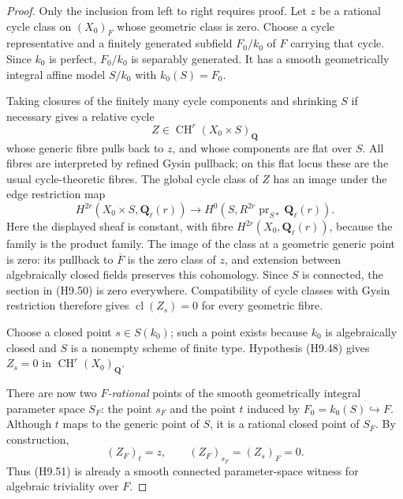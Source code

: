 \documentclass[11pt,a4paper]{article}
\begin{document}
\begin{proof}
Only the inclusion from left to right requires proof. Let $z$ be a
rational cycle class on $(X_0)_F$ whose geometric class is zero.
Choose a cycle representative and a finitely generated subfield
$F_0/k_0$ of $F$ carrying that cycle. Since $k_0$ is perfect,
$F_0/k_0$ is separably generated. It has a smooth geometrically
integral affine model $S/k_0$ with $k_0(S)=F_0$.

Taking closures of the finitely many cycle components and shrinking
$S$ if necessary gives a relative cycle
\[
 Z\in\operatorname{CH}^r(X_0\times S)_{\mathbf Q}
\]
whose generic fibre pulls back to $z$, and whose components are flat
over $S$. All fibres are interpreted by refined Gysin pullback; on
this flat locus these are the usual cycle-theoretic fibres. The
global cycle class of $Z$ has an image under the edge restriction map
\[
 H^{2r}(X_0\times S,\mathbf Q_\ell(r))
  \longrightarrow
 H^0\!\left(S,R^{2r}\operatorname{pr}_{S*}\mathbf Q_\ell(r)\right).
                                                               \tag{H9.50}
\]
Here the displayed sheaf is constant, with fibre
$H^{2r}(X_0,\mathbf Q_\ell(r))$, because the family is the product
family. The image of the class at a geometric generic point is zero:
its pullback to $\overline F$ is the zero class of $z$, and extension
between algebraically closed fields preserves this cohomology.
Since $S$ is connected, the section in (H9.50) is zero everywhere.
Compatibility of cycle classes with Gysin restriction therefore
gives $\operatorname{cl}(Z_s)=0$ for every geometric fibre.

Choose a closed point $s\in S(k_0)$; such a point exists because
$k_0$ is algebraically closed and $S$ is a nonempty scheme of finite
type. Hypothesis (H9.48) gives $Z_s=0$ in
$\operatorname{CH}^r(X_0)_{\mathbf Q}$.

There are now two \emph{$F$-rational} points of the smooth
geometrically integral parameter space $S_F$: the point $s_F$ and
the point $t$ induced by $F_0=k_0(S)\hookrightarrow F$. Although
$t$ maps to the generic point of $S$, it is a rational closed point
of $S_F$. By construction,
\[
 (Z_F)_t=z,\qquad (Z_F)_{s_F}=(Z_s)_F=0.
                                                               \tag{H9.51}
\]
Thus (H9.51) is already a smooth connected parameter-space witness
for algebraic triviality over $F$.


\end{proof}
\end{document}
